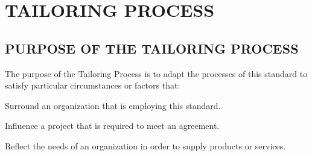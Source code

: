 \section{TAILORING PROCESS}

	\subsection{PURPOSE OF THE TAILORING PROCESS}
	\begin{adjustwidth}{0.5em}{0pt}
	
		The purpose of the Tailoring Process is to adapt the processes of this standard to satisfy particular circumstances or factors that:

		\begin{compactenum}

			\item Surround an organization that is employing this standard.
			
			\item Influence a project that is required to meet an agreement.
			
			\item Reflect the needs of an organization in order to supply products or services.
		
		\end{compactenum}

	\end{adjustwidth}

